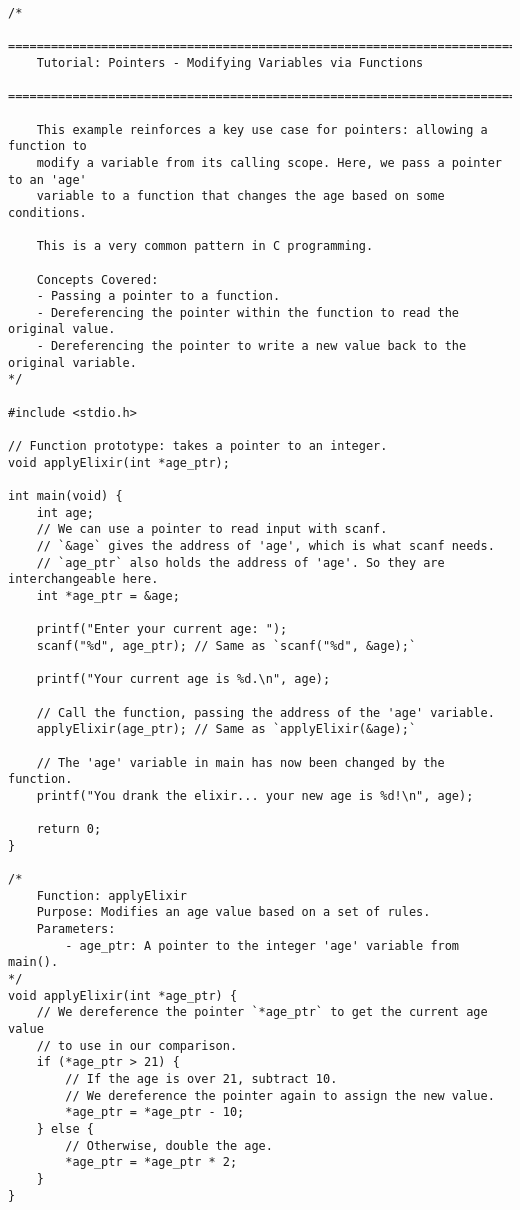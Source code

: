 \documentclass[11pt]{book}
\begin{document}
\begin{verbatim}
/*
    ================================================================================
    Tutorial: Pointers - Modifying Variables via Functions
    ================================================================================

    This example reinforces a key use case for pointers: allowing a function to
    modify a variable from its calling scope. Here, we pass a pointer to an 'age'
    variable to a function that changes the age based on some conditions.

    This is a very common pattern in C programming.

    Concepts Covered:
    - Passing a pointer to a function.
    - Dereferencing the pointer within the function to read the original value.
    - Dereferencing the pointer to write a new value back to the original variable.
*/

#include <stdio.h>

// Function prototype: takes a pointer to an integer.
void applyElixir(int *age_ptr);

int main(void) {
    int age;
    // We can use a pointer to read input with scanf.
    // `&age` gives the address of 'age', which is what scanf needs.
    // `age_ptr` also holds the address of 'age'. So they are interchangeable here.
    int *age_ptr = &age;

    printf("Enter your current age: ");
    scanf("%d", age_ptr); // Same as `scanf("%d", &age);`

    printf("Your current age is %d.\n", age);

    // Call the function, passing the address of the 'age' variable.
    applyElixir(age_ptr); // Same as `applyElixir(&age);`

    // The 'age' variable in main has now been changed by the function.
    printf("You drank the elixir... your new age is %d!\n", age);

    return 0;
}

/*
    Function: applyElixir
    Purpose: Modifies an age value based on a set of rules.
    Parameters:
        - age_ptr: A pointer to the integer 'age' variable from main().
*/
void applyElixir(int *age_ptr) {
    // We dereference the pointer `*age_ptr` to get the current age value
    // to use in our comparison.
    if (*age_ptr > 21) {
        // If the age is over 21, subtract 10.
        // We dereference the pointer again to assign the new value.
        *age_ptr = *age_ptr - 10;
    } else {
        // Otherwise, double the age.
        *age_ptr = *age_ptr * 2;
    }
}


\end{verbatim}
\end{document}
